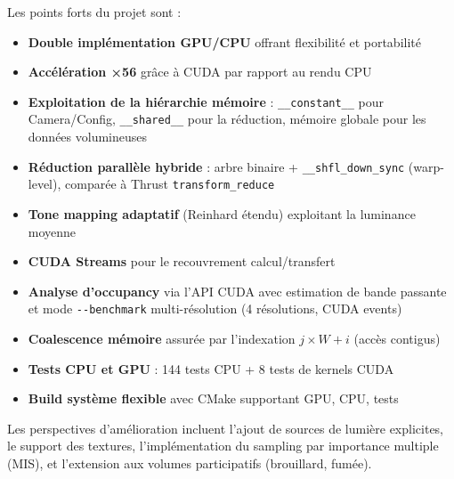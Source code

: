 \documentclass[12pt,a4paper]{article}
\begin{document}
Les points forts du projet sont :

\begin{itemize}
    \item \textbf{Double implémentation GPU/CPU} offrant flexibilité et portabilité
    \item \textbf{Accélération ×56} grâce à CUDA par rapport au rendu CPU
    \item \textbf{Exploitation de la hiérarchie mémoire} : \texttt{\_\_constant\_\_} pour Camera/Config,
    \texttt{\_\_shared\_\_} pour la réduction, mémoire globale pour les données volumineuses
    \item \textbf{Réduction parallèle hybride} : arbre binaire + \texttt{\_\_shfl\_down\_sync}
    (warp-level), comparée à Thrust \texttt{transform\_reduce}
    \item \textbf{Tone mapping adaptatif} (Reinhard étendu) exploitant la luminance moyenne
    \item \textbf{CUDA Streams} pour le recouvrement calcul/transfert
    \item \textbf{Analyse d'occupancy} via l'API CUDA avec estimation de bande passante
    et mode \texttt{-{}-benchmark} multi-résolution (4 résolutions, CUDA events)
    \item \textbf{Coalescence mémoire} assurée par l'indexation $j \times W + i$ (accès contigus)
    \item \textbf{Tests CPU et GPU} : 144 tests CPU + 8 tests de kernels CUDA
    \item \textbf{Build système flexible} avec CMake supportant GPU, CPU, tests
\end{itemize}

Les perspectives d'amélioration incluent l'ajout de sources de lumière explicites,
le support des textures, l'implémentation du sampling par importance multiple (MIS),
et l'extension aux volumes participatifs (brouillard, fumée).

\end{document}
